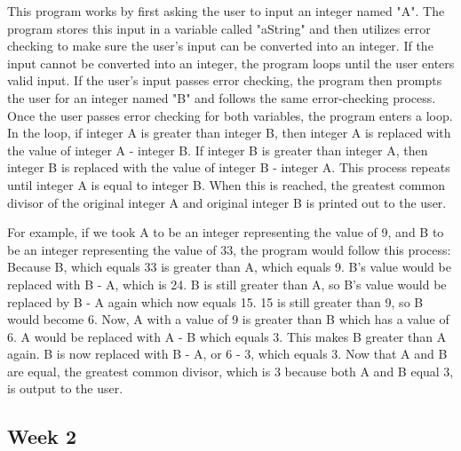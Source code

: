 \documentclass{article}
\theoremstyle{theorem}
\theoremstyle{definition}
\theoremstyle{remark}
\begin{document}
\indent
This program works by first asking the user to input an integer named "A". 
The program stores this input in a variable called "aString" and then utilizes error checking to make sure the user's input can be converted into an integer.
If the input cannot be converted into an integer, the program loops until the user enters valid input.
If the user's input passes error checking, the program then prompts the user for an integer named "B" and follows the same error-checking process.
Once the user passes error checking for both variables, the program enters a loop.
In the loop, if integer A is greater than integer B, then integer A is replaced with the value of integer A - integer B.
If integer B is greater than integer A, then integer B is replaced with the value of integer B - integer A.
This process repeats until integer A is equal to integer B. When this is reached, the greatest common divisor of the original integer A and original integer B is printed out to the user.

For example, if we took A to be an integer representing the value of 9, and B to be an integer representing the value of 33, the program would follow this process:
Because B, which equals 33 is greater than A, which equals 9. B's value would be replaced with B - A, which is 24. B is still greater than A, so B's value would be replaced by B - A again which now equals 15.
15 is still greater than 9, so B would become 6. Now, A with a value of 9 is greater than B which has a value of 6. A would be replaced with A - B which equals 3. This makes B greater than A again.
B is now replaced with B - A, or 6 - 3, which equals 3. Now that A and B are equal, the greatest common divisor, which is 3 because both A and B equal 3, is output to the user.

\subsection{Week 2}
\end{document}
